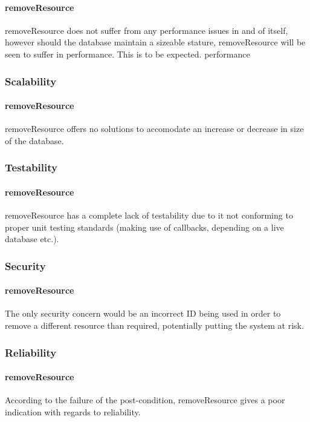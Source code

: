 \documentclass[a4paper]{article}
\begin{document}
\paragraph{removeResource}
removeResource does not suffer from any performance issues in and of itself, however should the database maintain a sizeable stature, removeResource will be seen to suffer in performance. This is to be expected.
performance


\subsubsection {Scalability}

\paragraph{removeResource}
removeResource offers no solutions to accomodate an increase or decrease in size of the database.

\subsubsection {Testability}

\paragraph{removeResource}
removeResource has a complete lack of testability due to it not conforming to proper unit testing standards (making use of callbacks, depending on a live database etc.).

\subsubsection {Security}

\paragraph{removeResource}
The only security concern would be an incorrect ID being used in order to remove a different resource than required, potentially putting the system at risk.

\subsubsection {Reliability}

\paragraph{removeResource}
According to the failure of the post-condition, removeResource gives a poor indication with regards to reliability.
\end{document}
